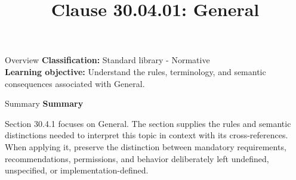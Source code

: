 \documentclass[10pt,letterpaper]{article}
\title{Clause 30.04.01: General}
\author{}
\date{}
\begin{document}
\maketitle
\begin{CornellOverviewBox}{Overview}
\textbf{Classification:} Standard library - Normative\\[2pt]
\textbf{Learning objective:} Understand the rules, terminology, and semantic consequences associated with General.
\end{CornellOverviewBox}\begin{CornellSummaryBox}{Summary}
{\sffamily\bfseries\color{Accent} Summary}\par\vspace{3pt}Section 30.4.1 focuses on General. The section supplies the rules and semantic distinctions needed to interpret this topic in context with its cross-references. When applying it, preserve the distinction between mandatory requirements, recommendations, permissions, and behavior deliberately left undefined, unspecified, or implementation-defined.
\end{CornellSummaryBox}
\end{document}
